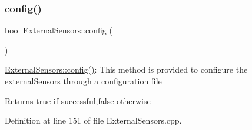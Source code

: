 \subsubsection{\texorpdfstring{config()}{config()}\hspace{0.1cm}{\footnotesize\ttfamily [1/2]}}
{\footnotesize\ttfamily bool External\+Sensors\+::config (\begin{DoxyParamCaption}{ }\end{DoxyParamCaption})}

\hyperlink{class_external_sensors_a862a4bd11346b37270d0244c2adabe5a}{External\+Sensors\+::config()}\+: This method is provided to configure the external\+Sensors through a configuration file

\begin{DoxyReturn}{Returns}
true if successful,false otherwise 
\end{DoxyReturn}


Definition at line 151 of file External\+Sensors.\+cpp.


